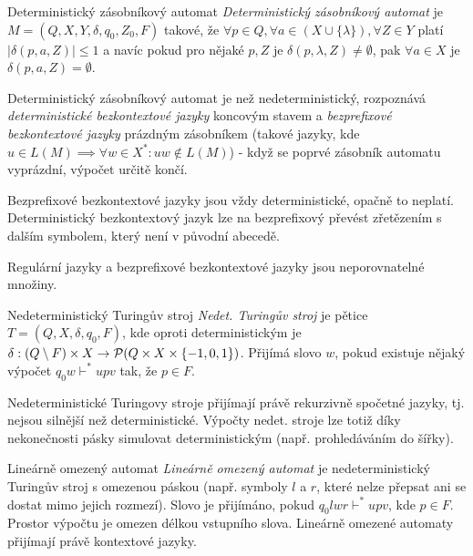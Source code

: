\begin{definiceN}{Deterministický zásobníkový automat}
\emph{Deterministický zásobníkový automat} je $M=(Q,X,Y,\delta,q_0,Z_0,F)$ takové, že $\forall p\in Q, \forall a\in (X\cup\{\lambda\}), \forall Z\in Y$ platí $|\delta(p,a,Z)|\leq 1$ a navíc pokud pro nějaké $p, Z$ je $\delta(p,\lambda,Z)\neq\emptyset$, pak $\forall a\in X$ je $\delta(p,a,Z)=\emptyset$. 
\end{definiceN}

\begin{poznamka}
Deterministický zásobníkový automat je  než nedeterministický, rozpoznává \emph{deterministické bezkontextové jazyky} koncovým stavem a \emph{bezprefixové bezkontextové jazyky} prázdným zásobníkem (takové jazyky, kde $u\in L(M)\implies \forall w\in X^{\ast}: uw\notin L(M)$) - když se poprvé zásobník automatu vyprázdní, výpočet určitě končí. 

Bezprefixové bezkontextové jazyky jsou vždy deterministické, opačně to neplatí. Deterministický bezkontextový jazyk lze na bezprefixový převést zřetězením s dalším symbolem, který není v původní abecedě. 

Regulární jazyky a bezprefixové bezkontextové jazyky jsou neporovnatelné množiny.
\end{poznamka}

\begin{definiceN}{Nedeterministický Turingův stroj}
\emph{Nedet. Turingův stroj} je pětice $T=(Q,X,\delta,q_0,F)$, kde oproti deterministickým je $\delta:(Q\setminus F)\times X \to \mathcal{P}(Q\times X\times \{-1,0,1\})$. Přijímá slovo $w$, pokud existuje nějaký výpočet $q_{0}w\vdash^{\ast} upv$ tak, že $p\in F$.
\end{definiceN}

\begin{poznamka}
Nedeterministické Turingovy stroje přijímají právě rekurzivně spočetné jazyky, tj. nejsou silnější než deterministické. Výpočty nedet. stroje lze totiž díky nekonečnosti pásky simulovat deterministickým (např. prohledáváním do šířky).
\end{poznamka}

\begin{definiceN}{Lineárně omezený automat}
\emph{Lineárně omezený automat} je nedeterministický Turingův stroj s omezenou páskou (např. symboly $l$ a $r$, které nelze přepsat ani se dostat mimo jejich rozmezí). Slovo je přijímáno, pokud $q_{0}lwr \vdash^{\ast} upv$, kde $p\in F$. Prostor výpočtu je omezen délkou vstupního slova. Lineárně omezené automaty přijímají právě kontextové jazyky.
\end{definiceN}


